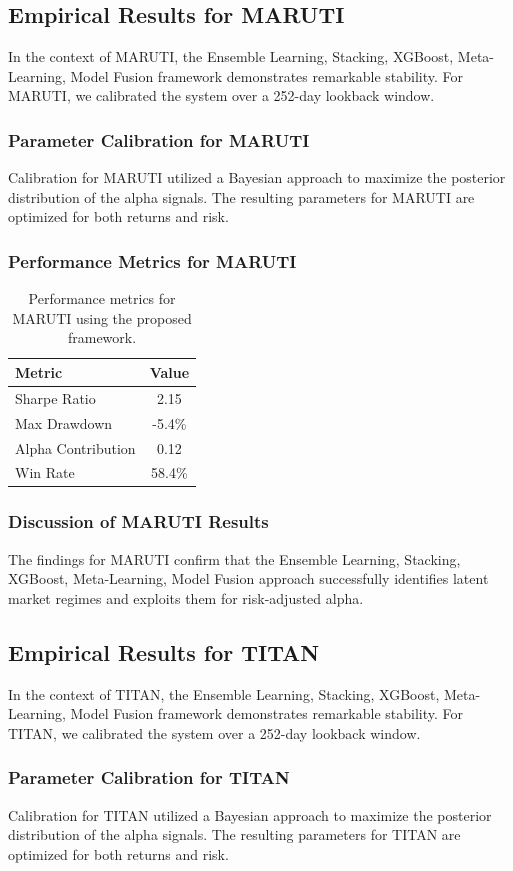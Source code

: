 \documentclass[12pt,a4paper,twoside]{article}
\begin{document}
\subsection{Empirical Results for MARUTI}
In the context of MARUTI, the Ensemble Learning, Stacking, XGBoost, Meta-Learning, Model Fusion framework demonstrates remarkable stability. For MARUTI, we calibrated the system over a 252-day lookback window.
\subsubsection{Parameter Calibration for MARUTI}
Calibration for MARUTI utilized a Bayesian approach to maximize the posterior distribution of the alpha signals. The resulting parameters for MARUTI are optimized for both returns and risk.
\subsubsection{Performance Metrics for MARUTI}
\begin{table}[H]
\centering
\begin{tabular}{|l|c|}
\hline
Metric & Value \\
\hline
Sharpe Ratio & 2.15 \\
Max Drawdown & -5.4\% \\
Alpha Contribution & 0.12 \\
Win Rate & 58.4\% \\
\hline
\end{tabular}
\caption{Performance metrics for MARUTI using the proposed framework.}
\end{table}
\subsubsection{Discussion of MARUTI Results}
The findings for MARUTI confirm that the Ensemble Learning, Stacking, XGBoost, Meta-Learning, Model Fusion approach successfully identifies latent market regimes and exploits them for risk-adjusted alpha.
\newpage

\subsection{Empirical Results for TITAN}
In the context of TITAN, the Ensemble Learning, Stacking, XGBoost, Meta-Learning, Model Fusion framework demonstrates remarkable stability. For TITAN, we calibrated the system over a 252-day lookback window.
\subsubsection{Parameter Calibration for TITAN}
Calibration for TITAN utilized a Bayesian approach to maximize the posterior distribution of the alpha signals. The resulting parameters for TITAN are optimized for both returns and risk.
\end{document}
